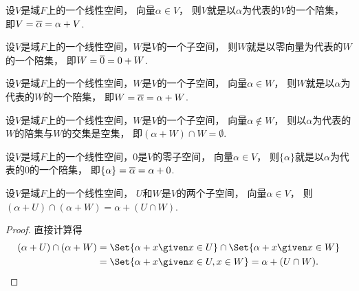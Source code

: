 \begin{proposition}
设\(V\)是域\(F\)上的一个线性空间，
向量\(\alpha \in V\)，
则\(V\)就是以\(\alpha\)为代表的\(V\)的一个陪集，
即\(
	V
	= \EquivalenceClassO{\alpha}
	= \alpha + V
\).
\end{proposition}

\begin{proposition}
设\(V\)是域\(F\)上的一个线性空间，\(W\)是\(V\)的一个子空间，
则\(W\)就是以零向量为代表的\(W\)的一个陪集，
即\(
	W
	= \EquivalenceClassO{0}
	= 0 + W
\).
\end{proposition}

\begin{proposition}
设\(V\)是域\(F\)上的一个线性空间，\(W\)是\(V\)的一个子空间，
向量\(\alpha \in W\)，
则\(W\)就是以\(\alpha\)为代表的\(W\)的一个陪集，
即\(
	W
	= \EquivalenceClassO{\alpha}
	= \alpha + W
\).
\end{proposition}

\begin{proposition}
设\(V\)是域\(F\)上的一个线性空间，\(W\)是\(V\)的一个子空间，
向量\(\alpha \notin W\)，
则以\(\alpha\)为代表的\(W\)的陪集与\(W\)的交集是空集，
即\(
	(\alpha + W) \cap W = \emptyset
\).
\end{proposition}

\begin{proposition}
设\(V\)是域\(F\)上的一个线性空间，\(0\)是\(V\)的零子空间，
向量\(\alpha \in V\)，
则\(\{\alpha\}\)就是以\(\alpha\)为代表的\(0\)的一个陪集，
即\(
	\{\alpha\}
	= \EquivalenceClassO{\alpha}
	= \alpha + 0
\).
\end{proposition}

\begin{proposition}
设\(V\)是域\(F\)上的一个线性空间，
\(U\)和\(W\)是\(V\)的两个子空间，
向量\(\alpha \in V\)，
则\((\alpha + U) \cap (\alpha + W) = \alpha + (U \cap W)\).
\begin{proof}
直接计算得\begin{align*}
	(\alpha + U) \cap (\alpha + W)
	&= \Set{ \alpha + x \given x \in U } \cap \Set{ \alpha + x \given x \in W } \\
	&= \Set{ \alpha + x \given x \in U, x \in W }
	= \alpha + (U \cap W).
	\qedhere
\end{align*}
\end{proof}
\end{proposition}

